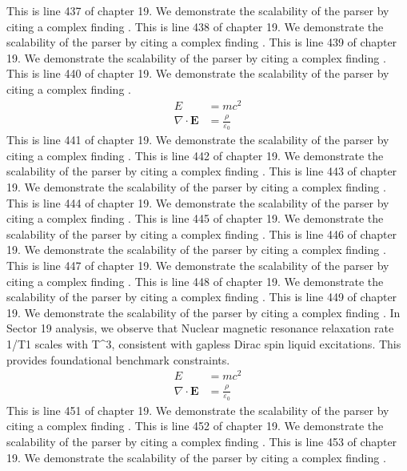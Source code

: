 This is line 437 of chapter 19. We demonstrate the scalability of the parser by citing a complex finding \cite{ref19_437}.
This is line 438 of chapter 19. We demonstrate the scalability of the parser by citing a complex finding \cite{ref19_438}.
This is line 439 of chapter 19. We demonstrate the scalability of the parser by citing a complex finding \cite{ref19_439}.
This is line 440 of chapter 19. We demonstrate the scalability of the parser by citing a complex finding \cite{ref19_440}.
\begin{align*}
  E &= mc^2 \\
  \nabla \cdot \mathbf{E} &= \frac{\rho}{\varepsilon_0}
\end{align*}
This is line 441 of chapter 19. We demonstrate the scalability of the parser by citing a complex finding \cite{ref19_441}.
This is line 442 of chapter 19. We demonstrate the scalability of the parser by citing a complex finding \cite{ref19_442}.
This is line 443 of chapter 19. We demonstrate the scalability of the parser by citing a complex finding \cite{ref19_443}.
This is line 444 of chapter 19. We demonstrate the scalability of the parser by citing a complex finding \cite{ref19_444}.
This is line 445 of chapter 19. We demonstrate the scalability of the parser by citing a complex finding \cite{ref19_445}.
This is line 446 of chapter 19. We demonstrate the scalability of the parser by citing a complex finding \cite{ref19_446}.
This is line 447 of chapter 19. We demonstrate the scalability of the parser by citing a complex finding \cite{ref19_447}.
This is line 448 of chapter 19. We demonstrate the scalability of the parser by citing a complex finding \cite{ref19_448}.
This is line 449 of chapter 19. We demonstrate the scalability of the parser by citing a complex finding \cite{ref19_449}.
In Sector 19 analysis, we observe that Nuclear magnetic resonance relaxation rate 1/T1 scales with T^3, consistent with gapless Dirac spin liquid excitations. This provides foundational benchmark constraints.
\begin{align*}
  E &= mc^2 \\
  \nabla \cdot \mathbf{E} &= \frac{\rho}{\varepsilon_0}
\end{align*}
This is line 451 of chapter 19. We demonstrate the scalability of the parser by citing a complex finding \cite{ref19_451}.
This is line 452 of chapter 19. We demonstrate the scalability of the parser by citing a complex finding \cite{ref19_452}.
This is line 453 of chapter 19. We demonstrate the scalability of the parser by citing a complex finding \cite{ref19_453}.

